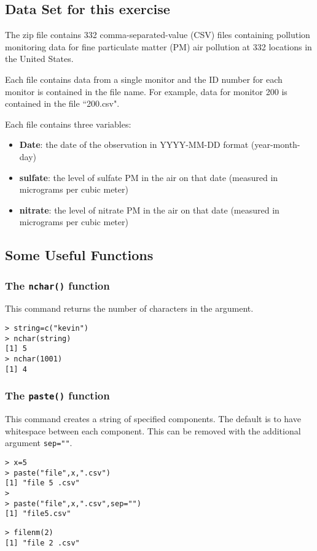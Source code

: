 \documentclass[]{article}
\begin{document}
\subsection{Data Set for this exercise}
The zip file contains 332 comma-separated-value (CSV) files containing pollution monitoring data for fine particulate matter (PM) air pollution at 332 locations in the United States. 

\bigskip
\noindent Each file contains data from a single monitor and the ID number for each monitor is contained in the file name. For example, data for monitor 200 is contained in the file ``200.csv". 

\bigskip
\noindent Each file contains three variables:
\begin{itemize}
\item \textbf{Date}: the date of the observation in YYYY-MM-DD format (year-month-day)
\item \textbf{sulfate}: the level of sulfate PM in the air on that date (measured in micrograms per cubic meter)
\item \textbf{nitrate}: the level of nitrate PM in the air on that date (measured in micrograms per cubic meter)
\end{itemize}
\newpage
\subsection{Some Useful Functions}
\subsubsection{The \texttt{nchar()} function}
This command returns the number of characters in the argument.
\begin{verbatim}
> string=c("kevin")
> nchar(string)
[1] 5
> nchar(1001)
[1] 4
\end{verbatim}
\subsubsection{The \texttt{paste()} function}
This command creates a string of specified components. The default is to have whitespace between each component. This can be removed with the additional argument \texttt{sep=""}.
\begin{framed}
\begin{verbatim}
> x=5
> paste("file",x,".csv")
[1] "file 5 .csv"
>
> paste("file",x,".csv",sep="")
[1] "file5.csv"
\end{verbatim}
\end{framed}
\begin{verbatim}
> filenm(2)
[1] "file 2 .csv"
\end{verbatim}
\end{document}
